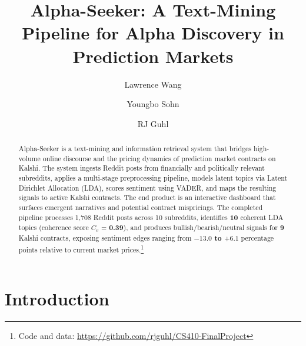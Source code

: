 \documentclass[sigconf]{acmart}
\begin{document}
\title{Alpha-Seeker: A Text-Mining Pipeline for Alpha Discovery in Prediction Markets}

\author{Lawrence Wang}

\author{Youngbo Sohn}

\author{RJ Guhl}

\begin{abstract}
Alpha-Seeker is a text-mining and information retrieval system that bridges high-volume online discourse and the pricing dynamics of prediction market contracts on Kalshi. The system ingests Reddit posts from financially and politically relevant subreddits, applies a multi-stage preprocessing pipeline, models latent topics via Latent Dirichlet Allocation (LDA), scores sentiment using VADER, and maps the resulting signals to active Kalshi contracts. The end product is an interactive dashboard that surfaces emergent narratives and potential contract mispricings. The completed pipeline processes 1,708 Reddit posts across 10 subreddits, identifies \textbf{10} coherent LDA topics (coherence score $C_v$ = \textbf{0.39}), and produces bullish/bearish/neutral signals for \textbf{9} Kalshi contracts, exposing sentiment edges ranging from \textbf{$-13.0$ to $+6.1$} percentage points relative to current market prices.\footnote{Code and data: \url{https://github.com/rjguhl/CS410-FinalProject}}
\end{abstract}


\maketitle

\section{Introduction}
\end{document}
